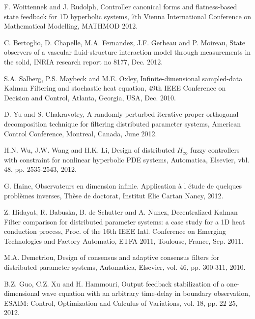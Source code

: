 \documentclass[journal]{IEEEtran}
\begin{document}
\begin{thebibliography}{100}

 \label{WoiRud12}
F. Woittennek and J. Rudolph, Controller canonical forms and flatness-based state feedback for 1D hyperbolic systems,
7th Vienna International Conference on Mathematical Modelling, MATHMOD 2012.

 \label{BerChoFerGerMoi12}
C. Bertoglio, D. Chapelle, M.A. Fernandez, J.F. Gerbeau and P. Moireau, State observers of a vascular fluid-structure interaction model through measurements in the solid, INRIA research report no 8177, Dec. 2012.

 \label{SalMayOxl10}
S.A. Salberg, P.S. Maybeck and M.E. Oxley, Infinite-dimensional sampled-data Kalman Filtering and stochastic
heat equation, 49th IEEE Conference on Decision and Control, Atlanta, Georgia, USA, Dec. 2010.

 \label{YuCha12}
D. Yu and S. Chakravotry, A randomly perturbed iterative proper orthogonal decomposition technique for filtering distributed parameter systems, American Control Conference, Montreal, Canada, June 2012.

 \label{WuWanLi12}
H.N. Wu, J.W. Wang and H.K. Li, Design of distributed $H_{\infty}$ fuzzy controllers with constraint for nonlinear hyperbolic PDE systems, Automatica, Elsevier, vbl. 48, pp. 2535-2543, 2012.

 \label{HaiRam10}
G. Haine, Observateurs en dimension infinie. Application \`{a} l \'{e}tude de quelques probl\`{e}mes inverses, Th\`{e}se de doctorat, Institut Elie Cartan Nancy, 2012.

 \label{HidBabSchuNun11}
Z. Hidayat, R. Babuska, B. de Schutter and A. Nunez, Decentralized Kalman Filter comparison for distributed parameter systems: a case study for a 1D heat conduction process, Proc. of the 16th IEEE Intl. Conference on Emerging Technologies and Factory Automatio, ETFA 2011, Toulouse, France, Sep. 2011.

 \label{Dem10}
M.A. Demetriou, Design of consensus and adaptive consensus filters for distributed parameter systems, Automatica, Elsevier, vol. 46, pp. 300-311, 2010.

 \label{GuoXuHam12}
B.Z. Guo, C.Z. Xu and H. Hammouri, Output feedback stabilization of a one-dimensional wave equation with an arbitrary
time-delay in boundary observation, ESAIM: Control, Optimization and Calculus of Variations, vol. 18, pp. 22-25, 2012.


\end{thebibliography}
\end{document}
